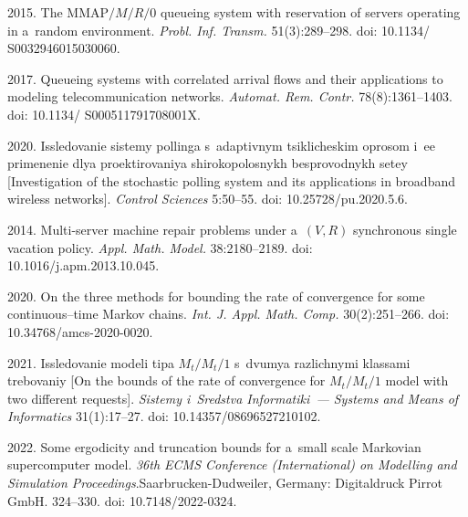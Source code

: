 \begin{multicols}{2}
{{\begin{thebibliography}{99}
 2015. The $\mathrm{MMAP}/M/R/0$ queueing system with reservation of servers operating in a~random environment. 
\textit{Probl. Inf. Transm.} 51(3):289--298. doi: 10.1134/ S0032946015030060.


 2017. Queueing systems with correlated arrival flows and their applications to modeling telecommunication networks. 
 \textit{Automat. Rem. Contr.} 78(8):1361--1403. doi: 10.1134/ S000511791708001X.

 2020. Issledovanie sis\-te\-my pol\-lin\-ga s~adap\-tiv\-nym tsik\-li\-che\-skim op\-ro\-som i~ee 
 pri\-me\-ne\-nie dlya pro\-ek\-ti\-ro\-va\-niya shi\-ro\-ko\-po\-los\-nykh bes\-pro\-vod\-nykh se\-tey 
 [Investigation of the stochastic polling system and its applications in broadband wireless networks]. \textit{Control Sciences} 
 5:50--55. doi: 10.25728/pu.2020.5.6.



 2014. Multi-server machine repair problems under a~$(V,R)$ synchronous single vacation policy. \textit{Appl. Math. Model.} 38:2180--2189. 
 doi: 10.1016/j.apm.2013.10.045.

 2020. On the three methods for bounding the rate of convergence for some continuous--time Markov chains. 
 \textit{Int. J. Appl. Math. Comp.} 30(2):251--266. 
 doi: 10.34768/amcs-2020-0020.

 2021. Is\-sle\-do\-va\-nie mo\-de\-li ti\-pa $M_t/M_t/1$ s~dvu\-mya raz\-lich\-ny\-mi klas\-sa\-mi tre\-bo\-va\-niy 
[On the bounds of the rate of convergence for $M_t/M_t/1$ model with two different requests]. \textit{Sis\-te\-my i~Sredstva Informatiki~--- 
Systems and Means of Informatics} 31(1):17--27.  doi: 10.14357/08696527210102.

 2022. Some ergodicity and truncation bounds for a~small scale Markovian supercomputer model. 
 \textit{36th ECMS Conference (International) on Modelling and Simulation Proceedings}.\linebreak Saarbrucken-Dudweiler, Germany: Digitaldruck Pirrot GmbH. 324--330. 
 doi: 10.7148/2022-0324.
 

\end{thebibliography}}}
\end{multicols}
